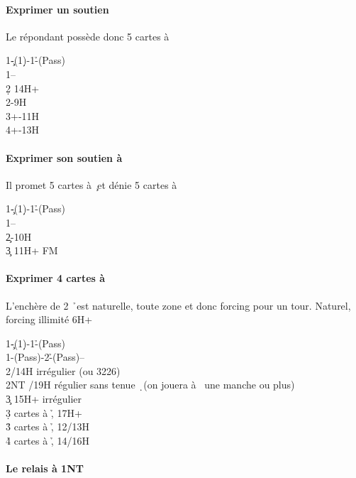 \documentclass[a4paper]{article}
\begin{document}
\paragraph{Exprimer un soutien \pdfs}

Le répondant possède donc 5 cartes à \s 

\begin{bidtable}
1\c-(1\d)-1\h-(Pass)\\
1\s--\\
2\d \> 14H+\\
2\s {}-9H\\
3\s {}+-11H\\
4\s {}+-13H
\end{bidtable}

\paragraph{Exprimer son soutien à \pdfc}

Il promet 5 cartes à \c\ et dénie 5 cartes à \s 

\begin{bidtable}
1\c-(1\d)-1\h-(Pass)\\
1\s--\\
2\c {}-10H\\
3\c \> 11H+ FM
\end{bidtable}

\paragraph{Exprimer 4 cartes à \pdfh}

L’enchère de 2 \h\ est naturelle, toute zone et donc forcing pour un tour.
Naturel, forcing illimité 6H+

\begin{bidtable}
1\c-(1\d)-1\h-(Pass)\\
1\s-(Pass)-2\h-(Pass)--\\
2\s {}/14H irrégulier (ou 3226)\\
2NT /19H régulier sans tenue \d\ (on jouera à \s\ une manche ou plus)\\
3\c \> 15H+ irrégulier\\
3\d {} cartes à \h , 17H+\\
3\h {} cartes à \h , 12/13H\\
4\h {} cartes à \h , 14/16H
\end{bidtable}

\paragraph{Le relais à 1NT}
\end{document}
